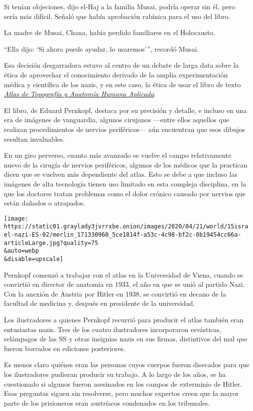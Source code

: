 Si tenían objeciones, dijo el-Haj a la familia Musai, podría operar sin
él, pero sería más difícil. Señaló que había aprobación rabínica para el
uso del libro.

La madre de Musai, Chana, había perdido familiares en el Holocausto.

``Ella dijo: `Si ahora puede ayudar, lo usaremos''', recordó Musai.

Esa decisión desgarradora estuvo al centro de un debate de larga data
sobre la ética de aprovechar el conocimiento derivado de la amplia
experimentación médica y científica de los nazis, y en este caso, la
ética de usar el libro de texto
\href{https://www.nytimes3xbfgragh.onion/1996/11/26/science/doctors-question-use-of-nazi-s-medical-atlas.html}{\emph{Atlas
de Topografía y Anatomía Humana Aplicada}}.

El libro, de Eduard Pernkopf, destaca por su precisión y detalle, e
incluso en una era de imágenes de vanguardia, algunos cirujanos ---entre
ellos aquellos que realizan procedimientos de nervios periféricos--- aún
encuentran que esos dibujos resultan invaluables.

En un giro perverso, cuanto más avanzado se vuelve el campo
relativamente nuevo de la cirugía de nervios periféricos, algunos de los
médicos que la practican dicen que se vuelven más dependiente del atlas.
Esto se debe a que incluso las imágenes de alta tecnología tienen uso
limitado en esta compleja disciplina, en la que los doctores tratan
problemas como el dolor crónico causado por nervios que están dañados o
atrapados.

\texttt{[image: https://static01.graylady3jvrrxbe.onion/images/2020/04/21/world/15israel-nazi-ES-02/merlin\_171330960\_5ce1814f-a53c-4c98-bf2c-0b19454cc66a-articleLarge.jpg?quality=75\\\&auto=webp\\\&disable=upscale]}

Pernkopf comenzó a trabajar con el atlas en la Universidad de Viena,
cuando se convirtió en director de anatomía en 1933, el año en que se
unió al partido Nazi. Con la anexión de Austria por Hitler en 1938, se
convirtió en decano de la facultad de medicina y, después en presidente
de la universidad.

Los ilustradores a quienes Pernkopf recurrió para producir el atlas
también eran entusiastas nazis. Tres de los cuatro ilustradores
incorporaron esvásticas, relámpagos de las SS y otras insignias nazis en
sus firmas, distintivos del mal que fueron borrados en ediciones
posteriores.

Es menos claro quiénes eran las personas cuyos cuerpos fueron disecados
para que los ilustradores pudieran producir su trabajo. A lo largo de
los años, se ha cuestionado si algunos fueron asesinados en los campos
de exterminio de Hitler. Esas preguntas siguen sin resolverse, pero
muchos expertos creen que la mayor parte de los prisioneros eran
austríacos condenados en los tribunales.

